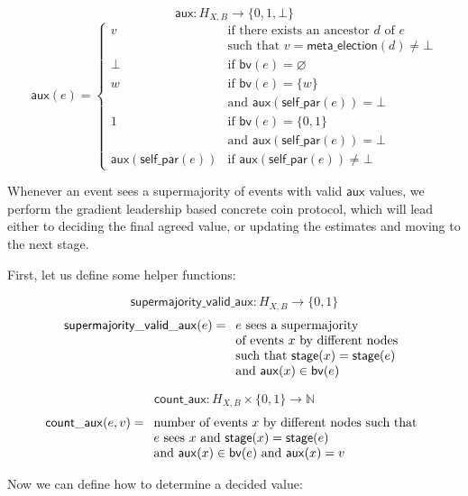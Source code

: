 \documentclass[a4paper,fleqn]{article}
\begin{document}
\[ \mathsf{aux}: H_{X,B} \to \{0, 1, \bot\} \]
\[ \mathsf{aux}(e) = \left\{ \begin{array}{ll}
	v & \textrm{if there exists an ancestor $d$ of $e$} \\
	& \textrm{such that $v = \mathsf{meta\_election}(d) \neq \bot$} \\
	\bot & \textrm{if $\mathsf{bv}(e) = \varnothing$} \\
	w & \textrm{if $\mathsf{bv}(e) = \{ w \}$} \\
	& \textrm{and $\mathsf{aux}(\mathsf{self\_par}(e)) = \bot$ } \\
	1 & \textrm{if $\mathsf{bv}(e) = \{ 0,1 \}$} \\
	& \textrm{and $\mathsf{aux}(\mathsf{self\_par}(e)) = \bot$ } \\
	\mathsf{aux}(\mathsf{self\_par}(e)) & \textrm{if $\mathsf{aux}(\mathsf{self\_par}(e))
		\neq \bot$}
\end{array}\right. \]

Whenever an event sees a supermajority of events with valid $\mathsf{aux}$ values, we perform the
gradient leadership based concrete coin protocol, which will lead either to deciding the final
agreed value, or updating the estimates and moving to the next stage.  

First, let us define some helper functions:

\[ \mathsf{supermajority\_valid\_aux}: H_{X,B} \to \{0,1\} \]
\[ \mathsf{supermajority\_valid\_aux}(e) = \begin{array}[t]{l}
	\textrm{$e$ sees a supermajority} \\
	\textrm{of events $x$ by different nodes} \\
	\textrm{such that $\mathsf{stage}(x) = \mathsf{stage}(e)$} \\
	\textrm{and $\mathsf{aux}(x) \in \mathsf{bv}(e)$}
\end{array} \]

\[ \mathsf{count\_aux}: H_{X,B} \times \{0, 1\} \to \mathbb{N} \]
\[ \mathsf{count\_aux}(e, v) = \begin{array}[t]{l}
	\textrm{number of events $x$ by different nodes such that} \\
	\textrm{$e$ sees $x$ and $\mathsf{stage}(x) = \mathsf{stage}(e)$} \\
	\textrm{and $\mathsf{aux}(x) \in \mathsf{bv}(e)$ and $\mathsf{aux}(x) = v$}
\end{array} \]

Now we can define how to determine a decided value:
\end{document}
